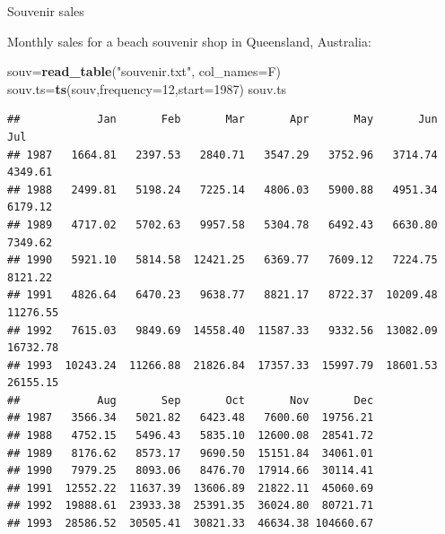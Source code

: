 \documentclass[ignorenonframetext,]{beamer}
\newenvironment{Shaded}{\begin{snugshade}}{\end{snugshade}}
\newcommand{\DataTypeTok}[1]{\textcolor[rgb]{0.13,0.29,0.53}{#1}}
\newcommand{\DecValTok}[1]{\textcolor[rgb]{0.00,0.00,0.81}{#1}}
\newcommand{\KeywordTok}[1]{\textcolor[rgb]{0.13,0.29,0.53}{\textbf{#1}}}
\newcommand{\NormalTok}[1]{#1}
\newcommand{\StringTok}[1]{\textcolor[rgb]{0.31,0.60,0.02}{#1}}
\begin{document}
\begin{frame}[fragile]{Souvenir sales}
\protect\hypertarget{souvenir-sales}{}

Monthly sales for a beach souvenir shop in Queensland, Australia:

\scriptsize

\begin{Shaded}
\begin{Highlighting}[]
\NormalTok{souv=}\KeywordTok{read_table}\NormalTok{(}\StringTok{"souvenir.txt"}\NormalTok{, }\DataTypeTok{col_names=}\NormalTok{F)}
\NormalTok{souv.ts=}\KeywordTok{ts}\NormalTok{(souv,}\DataTypeTok{frequency=}\DecValTok{12}\NormalTok{,}\DataTypeTok{start=}\DecValTok{1987}\NormalTok{)}
\NormalTok{souv.ts}
\end{Highlighting}
\end{Shaded}

\begin{verbatim}
##            Jan       Feb       Mar       Apr       May       Jun       Jul
## 1987   1664.81   2397.53   2840.71   3547.29   3752.96   3714.74   4349.61
## 1988   2499.81   5198.24   7225.14   4806.03   5900.88   4951.34   6179.12
## 1989   4717.02   5702.63   9957.58   5304.78   6492.43   6630.80   7349.62
## 1990   5921.10   5814.58  12421.25   6369.77   7609.12   7224.75   8121.22
## 1991   4826.64   6470.23   9638.77   8821.17   8722.37  10209.48  11276.55
## 1992   7615.03   9849.69  14558.40  11587.33   9332.56  13082.09  16732.78
## 1993  10243.24  11266.88  21826.84  17357.33  15997.79  18601.53  26155.15
##            Aug       Sep       Oct       Nov       Dec
## 1987   3566.34   5021.82   6423.48   7600.60  19756.21
## 1988   4752.15   5496.43   5835.10  12600.08  28541.72
## 1989   8176.62   8573.17   9690.50  15151.84  34061.01
## 1990   7979.25   8093.06   8476.70  17914.66  30114.41
## 1991  12552.22  11637.39  13606.89  21822.11  45060.69
## 1992  19888.61  23933.38  25391.35  36024.80  80721.71
## 1993  28586.52  30505.41  30821.33  46634.38 104660.67
\end{verbatim}

\normalsize

\end{frame}
\end{document}
